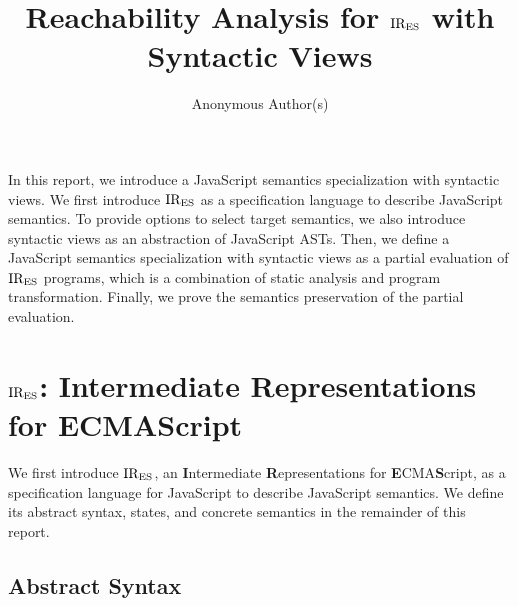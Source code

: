 \documentclass[10pt,conference]{IEEEtran}
\begin{document}
\title{Reachability Analysis for $\text{IR}_\text{ES}$ with Syntactic Views}

\author{Anonymous Author(s)}

%
%
%
%
%
%

\maketitle

In this report, we introduce a JavaScript semantics specialization with
syntactic views.  We first introduce $\text{IR}_\text{ES}$ as a specification language to
describe JavaScript semantics. To provide options to select target semantics, we
also introduce syntactic views as an abstraction of JavaScript ASTs.  Then, we
define a JavaScript semantics specialization with syntactic views as a partial
evaluation of $\text{IR}_\text{ES}$ programs, which is a combination of static analysis and
program transformation. Finally, we prove the semantics preservation of the
partial evaluation.

\section{$\text{IR}_\text{ES}$: Intermediate Representations for ECMAScript}

We first introduce $\text{IR}_\text{ES}$, an \textbf{I}ntermediate \textbf{R}epresentations
for \textbf{E}CMA\textbf{S}cript, as a specification language for JavaScript to
describe JavaScript semantics. We define its abstract syntax, states, and
concrete semantics in the remainder of this report.

\subsection{Abstract Syntax}
\end{document}
